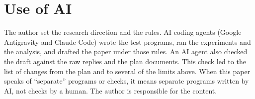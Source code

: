 \documentclass[10pt,twocolumn]{article}
\begin{document}
\section*{Use of AI}
The author set the research direction and the rules. AI coding agents (Google Antigravity and Claude Code) wrote the test programs, ran the experiments and the analysis, and drafted the paper under those rules. An AI agent also checked the draft against the raw replies and the plan documents. This check led to the list of changes from the plan and to several of the limits above. When this paper speaks of ``separate'' programs or checks, it means separate programs written by AI, not checks by a human. The author is responsible for the content.



\end{document}
